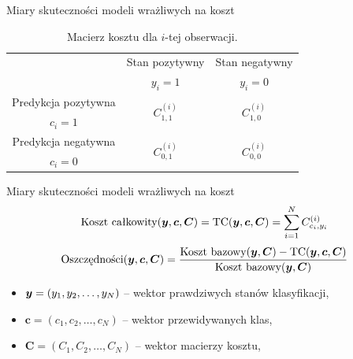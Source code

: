\documentclass{beamer}
\begin{document}
\begin{frame}{Miary skuteczności modeli wrażliwych na koszt}
	\begin{table}[h]
		\begin{center}
			\begin{tabular}{c|c|c}
				\multirow{2}{4em}{} & Stan pozytywny & Stan negatywny \\
				& $y_i = 1$            & $y_i = 0$ \\
				\hline
				Predykcja pozytywna & \multirow{2}{4em}{\centering $C^{(i)}_{1,1}$} & \multirow{2}{4em}{\centering $C^{(i)}_{1,0}$} \\
				$c_i = 1$         &                    &                    \\
				\hline
				Predykcja negatywna & \multirow{2}{4em}{\centering $C^{(i)}_{0,1}$} & \multirow{2}{4em}{\centering $C^{(i)}_{0,0}$} \\
				$c_i = 0$         &                    &                    \\
			\end{tabular}
		\end{center}
		\caption{Macierz kosztu dla $i$-tej obserwacji.}
		\label{tab:macierz-kosztu}
	\end{table}
\end{frame}

\begin{frame}{Miary skuteczności modeli wrażliwych na koszt}
	$$ \text{Koszt całkowity}(\boldsymbol{y}, \boldsymbol{c}, \boldsymbol{C}) = \text{TC}(\boldsymbol{y}, \boldsymbol{c}, \boldsymbol{C})= \sum_{i=1}^N C^{(i)}_{c_i,y_i} $$
	$$ \text{Oszczędności}(\boldsymbol{y}, \boldsymbol{c}, \boldsymbol{C}) = \frac{\text{Koszt bazowy}(\boldsymbol{y}, \boldsymbol{C}) - \text{TC}(\boldsymbol{y}, \boldsymbol{c}, \boldsymbol{C})}{\text{Koszt bazowy}(\boldsymbol{y}, \boldsymbol{C})} $$
	\begin{itemize}
		\item $\boldsymbol{y} = (y_1, y_2, \dots, y_N)$ -- wektor prawdziwych stanów klasyfikacji,
		\item $\boldsymbol{c} = (c_1, c_2, \dots, c_N) $ -- wektor przewidywanych klas,
		\item $ \boldsymbol{C} = (C_1, C_2, \dots, C_N) $ -- wektor macierzy kosztu,
	\end{itemize}
\end{frame}
\end{document}
